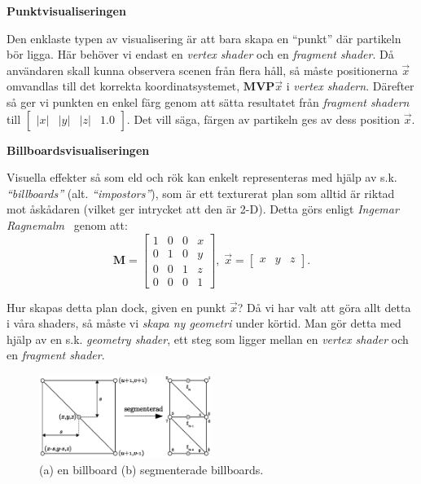 \documentclass[a4paper]{article}
\begin{document}
\begin{multicols}{2}
\textbf{Punktvisualiseringen}

Den enklaste typen av visualisering är att bara skapa en ``punkt'' där partikeln bör ligga. Här behöver vi endast en \emph{vertex shader} och en \emph{fragment shader}. Då användaren skall kunna observera scenen från flera håll, så måste positionerna \(\vec{x}\) omvandlas till det korrekta koordinatsystemet, \(\mathbf{MVP}\vec{x}\) i \emph{vertex shadern}. Därefter så ger vi punkten en enkel färg genom att sätta resultatet från \emph{fragment shadern} till \(\begin{bmatrix}|x| & |y| & |z| & 1.0\end{bmatrix}\). Det vill säga, färgen av partikeln ges av dess position \(\vec{x}\).

\textbf{Billboardsvisualiseringen}

Visuella effekter så som eld och rök kan enkelt representeras med hjälp av s.k. \emph{``billboards''} (alt. \emph{``impostors''}), som är ett texturerat plan som alltid är riktad mot åskådaren (vilket ger intrycket att den är 2-D). Detta görs enligt \emph{Ingemar Ragnemalm}~\cite{ragnemalm2008polygons} genom att: \[\mathbf{M} = \begin{bmatrix} 1 & 0 & 0 & x \\
                                    0 & 1 & 0 & y \\
                                    0 & 0 & 1 & z \\
                                    0 & 0 & 0 & 1 \end{bmatrix}, \;
          \vec{x} = \begin{bmatrix}x & y & z\end{bmatrix}.\]

Hur skapas detta plan dock, given en punkt \(\vec{x}\)? Då vi har valt att göra allt detta i våra shaders, så måste vi \emph{skapa ny geometri} under körtid. Man gör detta med hjälp av en s.k. \emph{geometry shader}, ett steg som ligger mellan en \emph{vertex shader} och en \emph{fragment shader}.

\vspace{-0.3cm}
\begin{figure}[H]
\center
\includegraphics[width=0.5\textwidth]{share/Billboards.eps}
\caption{(a) en billboard (b) segmenterade billboards.}
\label{fig:bill}
\end{figure}
\vspace{-0.3cm}


\end{multicols}
\end{document}
